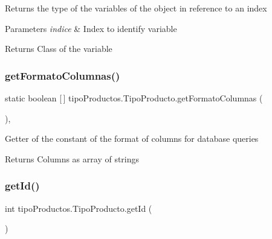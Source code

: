 Returns the type of the variables of the object in reference to an index


\begin{DoxyParams}{Parameters}
{\em indice} & Index to identify variable \\
\hline
\end{DoxyParams}
\begin{DoxyReturn}{Returns}
Class of the variable 
\end{DoxyReturn}
\mbox{\label{classtipo_productos_1_1_tipo_producto_ad2401fcfc8d348edc222e4a39ad00179}} 
\subsubsection{\texorpdfstring{get\+Formato\+Columnas()}{getFormatoColumnas()}}
{\footnotesize\ttfamily static boolean \mbox{[}$\,$\mbox{]} tipo\+Productos.\+Tipo\+Producto.\+get\+Formato\+Columnas (\begin{DoxyParamCaption}{ }\end{DoxyParamCaption})\hspace{0.3cm}{\ttfamily [inline]}, {\ttfamily [static]}}

Getter of the constant of the format of columns for database queries

\begin{DoxyReturn}{Returns}
Columns as array of strings 
\end{DoxyReturn}
\mbox{\label{classtipo_productos_1_1_tipo_producto_aede2d99770807b639e1e3f9f75dd2f65}} 
\subsubsection{\texorpdfstring{get\+Id()}{getId()}}
{\footnotesize\ttfamily int tipo\+Productos.\+Tipo\+Producto.\+get\+Id (\begin{DoxyParamCaption}{ }\end{DoxyParamCaption})\hspace{0.3cm}{\ttfamily [inline]}}

